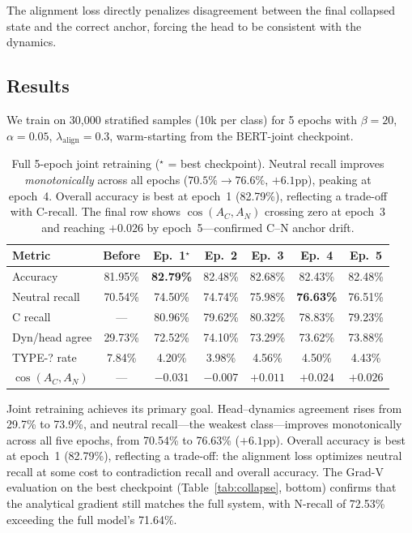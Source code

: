 \documentclass[11pt]{article}
\newcommand{\anchor}[1]{A_{#1}}
\begin{document}
The alignment loss directly penalizes disagreement between the final
collapsed state and the correct anchor, forcing the head to be
consistent with the dynamics.

\subsection{Results}

We train on 30,000 stratified samples (10k per class) for 5 epochs
with $\beta=20$, $\alpha=0.05$, $\lambda_{\text{align}}=0.3$, warm-starting
from the BERT-joint checkpoint.

\begin{table}[ht]
\centering
\begin{tabular}{@{}lcccccc@{}}
\toprule
Metric & Before & Ep.\ 1$^\star$ & Ep.\ 2 & Ep.\ 3 & Ep.\ 4 & Ep.\ 5 \\
\midrule
Accuracy       & 81.95\% & \textbf{82.79\%} & 82.48\% & 82.68\% & 82.43\% & 82.48\% \\
Neutral recall & 70.54\% & 74.50\% & 74.74\% & 75.98\% & \textbf{76.63\%} & 76.51\% \\
C recall       & ---     & 80.96\% & 79.62\% & 80.32\% & 78.83\% & 79.23\% \\
Dyn/head agree & 29.73\% & 72.52\% & 74.10\% & 73.29\% & 73.62\% & 73.88\% \\
TYPE-? rate    & 7.84\%  & 4.20\%  & 3.98\%  & 4.56\%  & 4.50\%  & 4.43\%  \\
\midrule
$\cos(\anchor{C},\anchor{N})$ & --- & $-0.031$ & $-0.007$ & $+0.011$ & $+0.024$ & $+0.026$ \\
\bottomrule
\end{tabular}
\caption{Full 5-epoch joint retraining ($^\star$ = best checkpoint).
Neutral recall improves \emph{monotonically} across all epochs
($70.5\% \to 76.6\%$, $+6.1$pp), peaking at epoch~4.
Overall accuracy is best at epoch~1 (82.79\%), reflecting a trade-off
with C-recall. The final row shows $\cos(\anchor{C},\anchor{N})$
crossing zero at epoch~3 and reaching $+0.026$ by epoch~5---confirmed
C--N anchor drift.}
\label{tab:joint}
\end{table}

Joint retraining achieves its primary goal. Head--dynamics agreement
rises from 29.7\% to 73.9\%, and neutral recall---the weakest
class---improves monotonically across all five epochs, from 70.54\%
to 76.63\% ($+6.1$pp). Overall accuracy is best at epoch~1 (82.79\%),
reflecting a trade-off: the alignment loss optimizes neutral recall at
some cost to contradiction recall and overall accuracy.
The Grad-V evaluation on the best checkpoint
(Table~\ref{tab:collapse}, bottom) confirms that the analytical gradient
still matches the full system, with N-recall of 72.53\% exceeding the
full model's 71.64\%.
\end{document}
